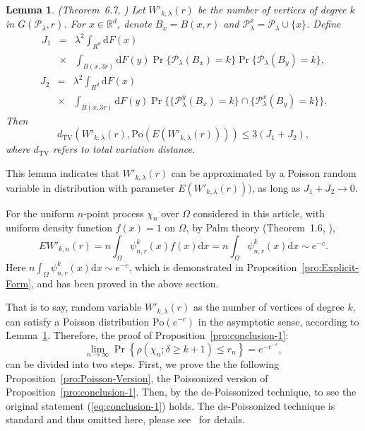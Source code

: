 \documentclass[preprint,12pt]{elsarticle}
\newtheorem{lemma}{Lemma}
\begin{document}
\begin{lemma}\label{lem:Poisson-approximation}(Theorem~6.7, \cite{Penrose-RGG-book})
Let $W'_{k,\lambda}(r)$ be the number of vertices of degree $k$ in $G(\mathcal{P}_\lambda, r)$.
For $x\in \mathbb{R}^d$, denote $B_x=B(x,r)$ and $\mathcal{P}_\lambda^x=\mathcal{P}_\lambda\cup\{x\}$. Define
\begin{eqnarray*}
 J_1  &=&\lambda^2\int_{R^d}\mathrm{d}F(x)\\
 &\times&\int_{B(x,3r)}\mathrm{d}F(y)\Pr\{\mathcal{P}_\lambda(B_x)=k\}\Pr\{\mathcal{P}_\lambda(B_y)=k\},
\end{eqnarray*}
\begin{eqnarray*}
J_2&=&\lambda^2\int_{R^d}\mathrm{d}F(x)\\
&\times&\int_{B(x,3r)}\mathrm{d}F(y)\Pr\{ \{\mathcal{P}^y_\lambda(B_x)=k\}\cap \{\mathcal{P}^x_\lambda(B_y)=k\}\}.
\end{eqnarray*}
Then
$$
    d_{\mathrm{TV}}(W'_{k,\lambda}(r), \mathrm{Po}(E(W'_{k,\lambda}(r))))\leq 3 (J_1+J_2),
$$
where $d_{\mathrm{TV}}$ refers to total variation distance.
\end{lemma}
This lemma indicates that { $W'_{k,\lambda}(r)$ can be approximated by a Poisson random variable}  in  distribution with parameter
$E(W'_{k,\lambda}(r)))$, as long as $J_1+J_2\rightarrow 0$.

\par For the  uniform $n$-point process  $\chi_n$ over $\Omega$ considered in this article, with uniform density function $f(x)=1$ on $\Omega$, by Palm theory (Theorem~1.6, \cite{Penrose-RGG-book}),
$$
     EW'_{k,n}(r)=  n\int_{\Omega} \psi^k_{n,r}(x)f(x)\mathrm{d}x   = n\int_{\Omega} \psi^k_{n,r}(x)\mathrm{d}x  \sim e^{-c}.
$$
Here $n\int_{\Omega} \psi^k_{n,r}(x)\mathrm{d}x\sim e^{-c}$, which is demonstrated in Proposition~\ref{pro:Explicit-Form},  and has been proved in the above section.


That is to say, random variable $W'_{k,\lambda}(r)$ as  the number of vertices of degree $k$, can satisfy a Poisson distribution $\mathrm{Po}(e^{-c})$ in the asymptotic sense, according to Lemma~\ref{lem:Poisson-approximation}.
Therefore, the proof of Proposition~\ref{pro:conclusion-1}:
$$
 \lim_{n\rightarrow\infty}\Pr\left\{\rho(\chi_n;\delta\geq k+1)\leq r_n\right\} =e^{-e^{-c}},
$$
can be divided into two steps. First, we  prove the the following Proposition~\ref{pro:Poisson-Version}, the
Poissonized version of Proposition~\ref{pro:conclusion-1}.
Then,  by the de-Poissonized technique,   to see the original statement (\ref{eq:conclusion-1}) holds. The de-Poissonized technique is standard and thus omitted here, please see~\cite{Penrose-k-connectivity} for details.
\end{document}

